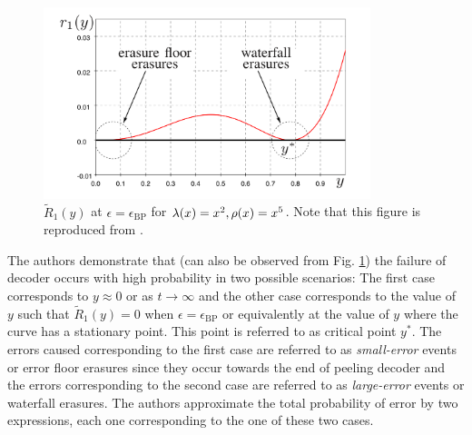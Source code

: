 \begin{figure}[!ht]
\centering
\includegraphics[width=0.85\textwidth]{data/UMAC/Figures/small_large_Erasures.png}
\caption{$\tilde{R}_{1}(y)$ at $\epsilon=\epsilon_{\text{BP}}$ for $\lambda(x)=x^2,\rho(x)=x^5$. Note that this figure is reproduced from \cite{amraoui2007find}.}
\label{Fig:LDPCResidual}
\end{figure}

 The authors \cite{amraoui2007find} demonstrate that (can also be observed from Fig. \ref{Fig:LDPCResidual}) the failure of decoder occurs with high probability in two possible scenarios: The first case corresponds to $y\approx 0$ or as $t\rightarrow \infty$ and the other case corresponds to the value of $y$ such that $\tilde{R}_{1}(y)=0$ when $\epsilon=\epsilon_{\text{BP}}$ or equivalently at the value of $y$ where the curve has a stationary point. This point is referred to as critical point $y^*.$ The errors caused corresponding to the first case are referred to as \textit{small-error} events or error floor erasures since they occur towards the end of peeling decoder and the errors corresponding to the second case are referred to as \textit{large-error} events or waterfall erasures. The authors approximate the total probability of error by two expressions, each one corresponding to the one of these two cases.
 

